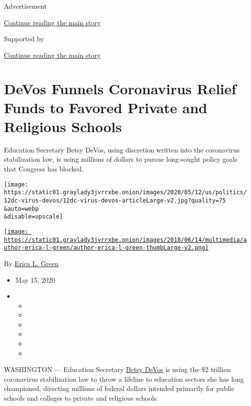 Advertisement

\protect\hyperlink{after-top}{Continue reading the main story}

Supported by

\protect\hyperlink{after-sponsor}{Continue reading the main story}

\hypertarget{devos-funnels-coronavirus-relief-funds-to-favored-private-and-religious-schools}{%
\section{DeVos Funnels Coronavirus Relief Funds to Favored Private and
Religious
Schools}\label{devos-funnels-coronavirus-relief-funds-to-favored-private-and-religious-schools}}

Education Secretary Betsy DeVos, using discretion written into the
coronavirus stabilization law, is using millions of dollars to pursue
long-sought policy goals that Congress has blocked.

\texttt{[image: https://static01.graylady3jvrrxbe.onion/images/2020/05/12/us/politics/12dc-virus-devos/12dc-virus-devos-articleLarge-v2.jpg?quality=75\\\&auto=webp\\\&disable=upscale]}

\href{https://nytimes3xbfgragh.onion/by/erica-l-green}{\texttt{[image: https://static01.graylady3jvrrxbe.onion/images/2018/06/14/multimedia/author-erica-l-green/author-erica-l-green-thumbLarge-v2.png]}}

By \href{https://nytimes3xbfgragh.onion/by/erica-l-green}{Erica L.
Green}

\begin{itemize}
\item
  May 15, 2020
\item
  \begin{itemize}
  \item
  \item
  \item
  \item
  \item
  \item
  \end{itemize}
\end{itemize}

WASHINGTON --- Education Secretary
\href{https://www.nytimes3xbfgragh.onion/2020/05/20/us/politics/trump-betsy-devos-student-debt-forgiveness.html}{Betsy
DeVos} is using the \$2 trillion coronavirus stabilization law to throw
a lifeline to education sectors she has long championed, directing
millions of federal dollars intended primarily for public schools and
colleges to private and religious schools.

